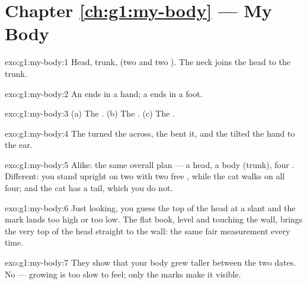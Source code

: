 \section*{Chapter \ref{ch:g1:my-body} --- My Body}

\begin{solution}{exo:g1:my-body:1}
Head, trunk,  (two  and two ). The neck joins the
head to the trunk.
\end{solution}

\begin{solution}{exo:g1:my-body:2}
An  ends in a hand; a  ends in a foot.
\end{solution}

\begin{solution}{exo:g1:my-body:3}
(a) The . (b) The . (c) The .
\end{solution}

\begin{solution}{exo:g1:my-body:4}
The  turned the  across, the  bent it, and the
 tilted the hand to the ear.
\end{solution}

\begin{solution}{exo:g1:my-body:5}
Alike: the same overall plan --- a head, a body (trunk), four
. Different: you stand upright on two  with two free
, while the cat walks on all four; and the cat has a tail,
which you do not.
\end{solution}

\begin{solution}{exo:g1:my-body:6}
Just looking, you guess the top of the head at a slant and the mark
lands too high or too low. The flat book, level and touching the
wall, brings the very top of the head straight to the wall: the
same fair measurement every time.
\end{solution}

\begin{solution}{exo:g1:my-body:7}
They show that your body grew taller between the two dates. No ---
growing is too slow to feel; only the marks make it visible.
\end{solution}

